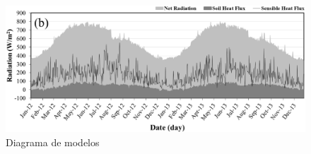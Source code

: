 \newpage
\begin{landscape}
\pagestyle{empty}
\begin{figure}
    \centering
    \includegraphics[width=1\textwidth]{Figures/f2.png}
    \caption{Diagrama de modelos}
    \label{fig:my_label5}
\end{figure}
\end{landscape}


